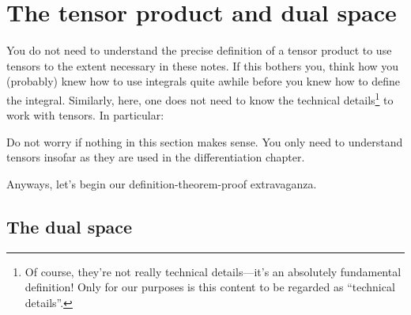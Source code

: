 \section{The tensor product and dual space}

You do not need to understand the precise definition of a tensor product to use tensors to the extent necessary in these notes.  If this bothers you, think how you (probably) knew how to use integrals quite awhile before you knew how to define the integral.  Similarly, here, one does not need to know the technical details\footnote{Of course, they're not really technical details---it's an absolutely fundamental definition!  Only for our purposes is this content to be regarded as ``technical details''.} to work with tensors.  In particular:
\begin{important}
	Do not worry if nothing in this section makes sense.  You only need to understand tensors insofar as they are used in the differentiation chapter.
\end{important}
Anyways, let's begin our definition-theorem-proof extravaganza.

\subsection{The dual space}

